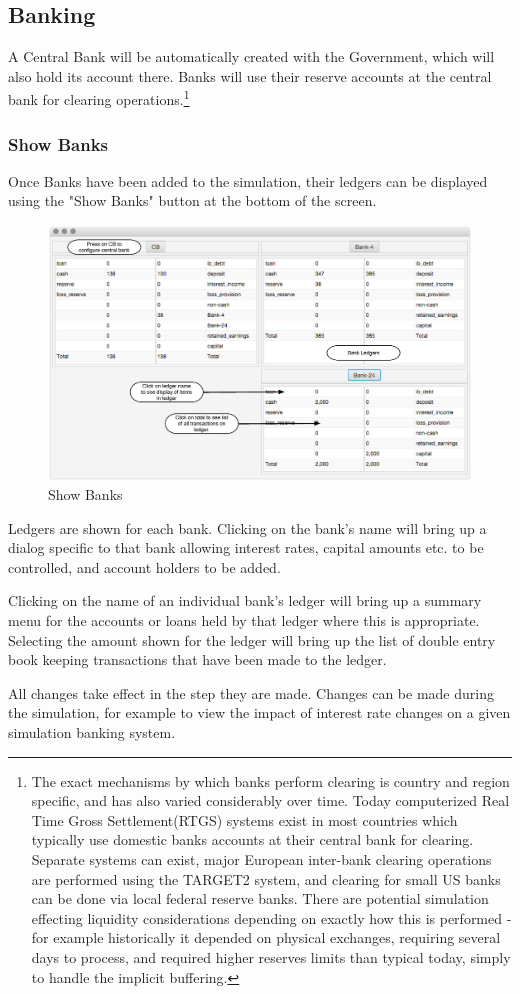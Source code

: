 \documentclass[10pt,oneside,openright, a4paper]{memoir}
\begin{document}
\subsection{Banking}
A Central Bank will be automatically created with the Government, which
will also hold its account there.  Banks will use their reserve 
accounts at the central bank for clearing operations.\footnote{The exact mechanisms by which banks perform clearing is 
country and region specific, and has also varied considerably
over time. Today computerized 
Real Time Gross Settlement(RTGS) systems exist in most countries which 
typically use domestic banks accounts at their central bank for clearing. 
Separate systems can exist, major European inter-bank clearing operations 
are performed using the TARGET2 system, and clearing for small US banks can 
be done via local federal reserve banks. There are potential simulation
effecting liquidity considerations depending on exactly how this is
performed - for example historically it depended on physical exchanges,
requiring several days to process, and required higher reserves limits
than typical today, simply to handle the implicit buffering.}
\par
\subsubsection{Show Banks}
Once Banks have been added to the simulation, their ledgers can be
displayed using the "Show Banks" button at the bottom of the screen.
\begin{figure}[h]
\begin{center}
\includegraphics[width=14cm]{images/fig_banks.eps}
\caption{Show Banks}
\label{fig:banks}
\end{center}
\end{figure}
Ledgers are shown for each bank. Clicking on the bank's name will
bring up a dialog specific to that bank allowing 
interest rates, capital amounts etc. to be controlled, and account
holders to be added. 
\par
Clicking on the name of an individual bank's ledger will bring up a summary 
menu for the accounts or loans held by that ledger where this is appropriate.
Selecting the amount shown for the ledger will bring up the list of double
entry book keeping transactions that have been made to the ledger.
\par
All changes take effect in the step they are made. Changes can be
made during the simulation, for example to view the impact of 
interest rate changes on a given simulation banking system.
\end{document}
